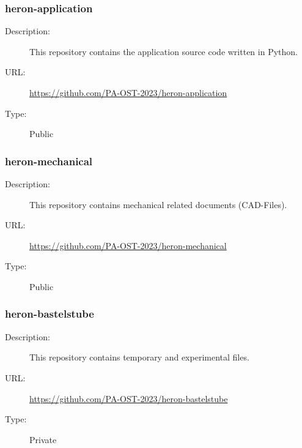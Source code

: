 \subsubsection{heron-application} \vspace{-0.2cm}
\begin{description}
	\item[Description:] This repository contains the application source code written in Python.\vspace{-0.25cm}
	\item[URL:] \url{https://github.com/PA-OST-2023/heron-application}\vspace{-0.25cm}
	\item[Type:] Public\vspace{-0.25cm}
\end{description}

\subsubsection{heron-mechanical} \vspace{-0.2cm}
\begin{description}
	\item[Description:] This repository contains mechanical related documents (CAD-Files).\vspace{-0.25cm}
	\item[URL:] \url{https://github.com/PA-OST-2023/heron-mechanical}\vspace{-0.25cm}
	\item[Type:] Public\vspace{-0.25cm}
\end{description}

\subsubsection{heron-bastelstube} \vspace{-0.2cm}
\begin{description}
	\item[Description:] This repository contains temporary and experimental files.\vspace{-0.25cm}
	\item[URL:] \url{https://github.com/PA-OST-2023/heron-bastelstube}\vspace{-0.25cm}
	\item[Type:] Private\vspace{-0.25cm}
\end{description}
\newpage

